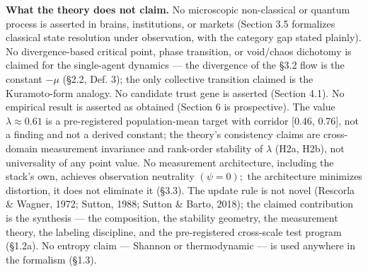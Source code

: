 \documentclass[
]{article}
\begin{document}
\textbf{What the theory does not claim.} No microscopic non-classical or
quantum process is asserted in brains, institutions, or markets (Section
3.5 formalizes classical state resolution under observation, with the
category gap stated plainly). No divergence-based critical point, phase
transition, or void/chaos dichotomy is claimed for the single-agent
dynamics --- the divergence of the §3.2 flow is the constant \(-\mu\)
(§2.2, Def. 3); the only collective transition claimed is the
Kuramoto-form analogy. No candidate trust gene is asserted (Section
4.1). No empirical result is asserted as obtained (Section 6 is
prospective). The value \(\lambda \approx 0.61\) is a pre-registered
population-mean target with corridor {[}0.46, 0.76{]}, not a finding and
not a derived constant; the theory's consistency claims are cross-domain
measurement invariance and rank-order stability of \(\lambda\) (H2a,
H2b), not universality of any point value. No measurement architecture,
including the stack's own, achieves observation neutrality
\((\psi = 0);\) the architecture minimizes distortion, it does not
eliminate it (§3.3). The update rule is not novel (Rescorla \& Wagner,
1972; Sutton, 1988; Sutton \& Barto, 2018); the claimed contribution is
the synthesis --- the composition, the stability geometry, the
measurement theory, the labeling discipline, and the pre-registered
cross-scale test program (§1.2a). No entropy claim --- Shannon or
thermodynamic --- is used anywhere in the formalism (§1.3).
\end{document}
